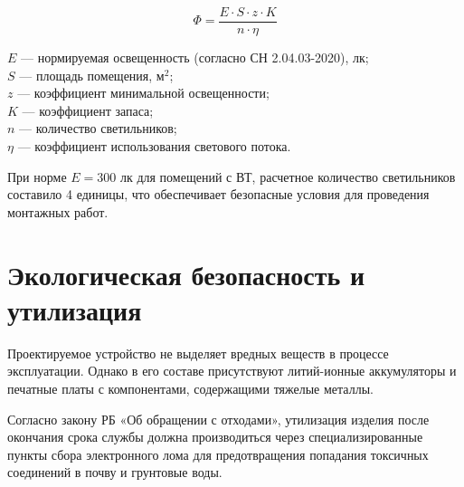 \begin{equation}
    \Phi = \frac{E \cdot S \cdot z \cdot K}{n \cdot \eta}
    \label{eq:light}
\end{equation}

\begin{formula_where}
    $E$ --- нормируемая освещенность (согласно СН 2.04.03-2020), лк; \\
    $S$ --- площадь помещения, $м^2$; \\
    $z$ --- коэффициент минимальной освещенности; \\
    $K$ --- коэффициент запаса; \\
    $n$ --- количество светильников; \\
    $\eta$ --- коэффициент использования светового потока.
\end{formula_where}

При норме $E = 300$ лк для помещений с ВТ, расчетное количество светильников составило 4 единицы, что обеспечивает безопасные условия для проведения монтажных работ.

\section{Экологическая безопасность и утилизация}

Проектируемое устройство не выделяет вредных веществ в процессе эксплуатации. Однако в его составе присутствуют литий-ионные аккумуляторы и печатные платы с компонентами, содержащими тяжелые металлы. 

Согласно закону РБ «Об обращении с отходами», утилизация изделия после окончания срока службы должна производиться через специализированные пункты сбора электронного лома для предотвращения попадания токсичных соединений в почву и грунтовые воды.

\newpage